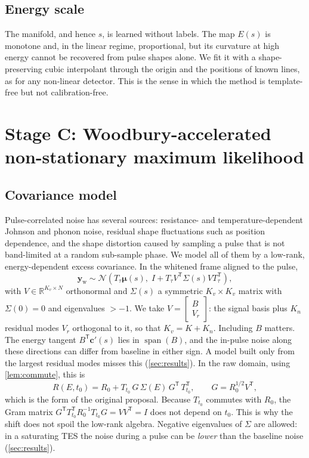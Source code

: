 \documentclass[aps,prapplied,reprint,superscriptaddress,longbibliography,nofootinbib]{revtex4-2}
\theoremstyle{remark}
\newcommand{\T}{\mathsf{T}}
\newcommand{\R}{\mathbb{R}}
\newcommand{\vect}[1]{\bm{#1}}
\newcommand{\Sh}[1]{T_{#1}}
\newcommand{\yw}{\vect{y}_{\mathrm w}}
\begin{document}
\subsection{Energy scale}
The manifold, and hence $s$, is learned without labels. The map $E(s)$ is monotone
and, in the linear regime, proportional, but its curvature at high energy cannot be
recovered from pulse shapes alone. We fit it with a shape-preserving cubic
interpolant through the origin and the positions of known lines, as for any
non-linear detector. This is the sense in which the method is template-free but
not calibration-free.

\section{Stage C: Woodbury-accelerated non-stationary maximum likelihood}
\label{sec:stageC}

\subsection{Covariance model}
Pulse-correlated noise has several sources: resistance- and temperature-dependent
Johnson and phonon noise, residual shape fluctuations such as position dependence,
and the shape distortion caused by sampling a pulse that is not band-limited at a
random sub-sample phase. We model all of them by a low-rank, energy-dependent excess
covariance. In the whitened frame aligned to the pulse,
\begin{equation}
\yw \sim \mathcal N\!\left(\Sh{\tau}\vect\mu(s),\; I+\Sh{\tau}V^\T\Sigma(s)V\Sh{\tau}^\T\right),
\label{eq:ns-model}
\end{equation}
with $V\in\R^{K_v\times N}$ orthonormal and $\Sigma(s)$ a symmetric $K_v\times K_v$
matrix with $\Sigma(0)=0$ and eigenvalues $>-1$. We take
$V=\left[\begin{smallmatrix}B\\V_r\end{smallmatrix}\right]$: the signal basis plus
$K_n$ residual modes $V_r$ orthogonal to it, so that $K_v=K+K_n$. Including $B$
matters. The energy tangent $B^\T\vect c'(s)$ lies in $\operatorname{span}(B)$, and
the in-pulse noise along these directions can differ from baseline in either sign.
A model built only from the largest residual modes misses this
(\cref{sec:results}). In the raw domain,
using \cref{lem:commute}, this is
\begin{equation}
R(E,t_0)=R_0+\Sh{t_0}\,G\,\Sigma(E)\,G^\T\,\Sh{t_0}^\T,\qquad G=R_0^{1/2}V^\T ,
\end{equation}
which is the form of the original proposal. Because $\Sh{t_0}$ commutes with $R_0$,
the Gram matrix $G^\T\Sh{t_0}^\T R_0^{-1}\Sh{t_0}G=VV^\T=I$ does not depend on
$t_0$. This is why the shift does not spoil the low-rank algebra. Negative
eigenvalues of $\Sigma$ are allowed: in a saturating TES the noise during a pulse
can be \emph{lower} than the baseline noise (\cref{sec:results}).
\end{document}
